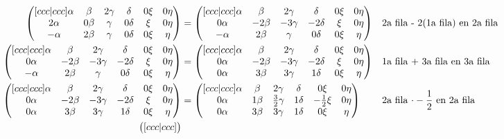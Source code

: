 \documentclass[letterpaper]{article}
\renewcommand{\*}{\cdot}
\theoremstyle{definition}
\begin{document}
	\begin{align*}
		\begin{pmatrix}[ccc|ccc]
		\alpha & \beta & 2\gamma & \delta & 0\xi & 0\eta\\
		2\alpha & 0\beta & \gamma & 0\delta & \xi & 0\eta\\
		-\alpha & 2\beta & \gamma & 0\delta & 0\xi & \eta
		\end{pmatrix} & = \begin{pmatrix}[ccc|ccc]
		\alpha & \beta & 2\gamma & \delta & 0\xi & 0\eta\\
		0\alpha & -2\beta & -3\gamma & -2\delta & \xi & 0\eta\\
		-\alpha & 2\beta & \gamma & 0\delta & 0\xi & \eta
		\end{pmatrix} && \text{2a fila - 2(1a fila) en 2a fila}\\
		\begin{pmatrix}[ccc|ccc]
		\alpha & \beta & 2\gamma & \delta & 0\xi & 0\eta\\
		0\alpha & -2\beta & -3\gamma & -2\delta & \xi & 0\eta\\
		-\alpha & 2\beta & \gamma & 0\delta & 0\xi & \eta
		\end{pmatrix} & = \begin{pmatrix}[ccc|ccc]
		\alpha & \beta & 2\gamma & \delta & 0\xi & 0\eta\\
		0\alpha & -2\beta & -3\gamma & -2\delta & \xi & 0\eta\\
		0\alpha & 3\beta & 3\gamma & 1\delta & 0\xi & \eta
		\end{pmatrix} && \text{1a fila + 3a fila en 3a fila}\\
		\begin{pmatrix}[ccc|ccc]
		\alpha & \beta & 2\gamma & \delta & 0\xi & 0\eta\\
		0\alpha & -2\beta & -3\gamma & -2\delta & \xi & 0\eta\\
		0\alpha & 3\beta & 3\gamma & 1\delta & 0\xi & \eta
		\end{pmatrix}  & = \begin{pmatrix}[ccc|ccc]
		\alpha & \beta & 2\gamma & \delta & 0\xi & 0\eta\\
		0\alpha & 1\beta & \frac{3}{2}\gamma & 1\delta & -\frac{1}{2}\xi & 0\eta\\
		0\alpha & 3\beta & 3\gamma & 1\delta & 0\xi & \eta
		\end{pmatrix}  && \text{2a fila $ \* -\frac{1}{2} $ en 2a fila} \\
		\begin{pmatrix}[ccc|ccc]

\end{pmatrix}
\end{align*}
\end{document}
